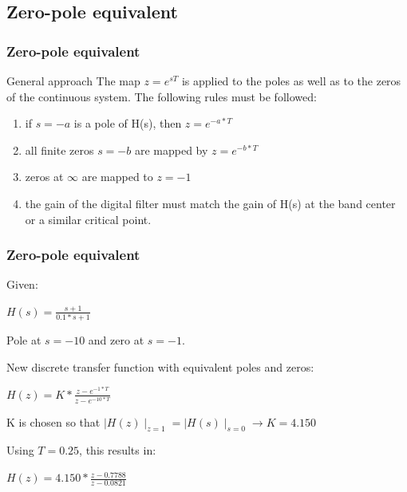 \subsection{Zero-pole equivalent}

\begin{frame}
	\frametitle{Zero-pole equivalent}
	\begin{block}{General approach}
		The map $z = e^{sT}$ is applied to the poles as well as to the zeros of the continuous system. The following rules must be followed:
		\begin{enumerate}
			\item if $s=-a$ is a pole of H(s), then $z=e^{-a*T}$
			\item all finite zeros $s=-b$ are mapped by $z = e^{-b*T}$
			\item zeros at $\infty$ are mapped to $z = -1$
			\item the gain of the digital filter must match the gain of H(s) at the band center or a similar critical point.
		\end{enumerate}
	\end{block}
\end{frame}

\begin{frame}
	\frametitle{Zero-pole equivalent}
	\begin{example}
		Given:
		\begin{center}
			$H(s) = \frac{s + 1}{0.1*s + 1}$
		\end{center}
		Pole at $s=-10$ and zero at $s=-1$.
		
		New discrete transfer function with equivalent poles and zeros:
		\begin{center}
			$H(z) = K * \frac{z - e^{-1*T}}{z - e^{-10*T}}$
		\end{center}
		K is chosen so that $\mid H(z)\mid _{z=1} = \mid H(s) \mid _{s=0} \to K=4.150$

		Using $T=0.25$, this results in:
		\begin{center}
			$H(z) = 4.150 * \frac{z-0.7788}{z-0.0821}$
		\end{center}
	\end{example}
\end{frame}


